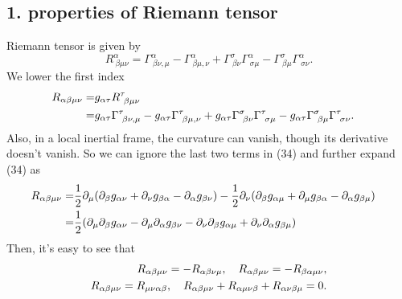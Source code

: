 \documentclass{article}
\begin{document}
\subsection*{1. properties of Riemann tensor}
Riemann tensor is given by
\begin{equation}
R^\alpha_{~\beta \mu\nu} = \Gamma^\alpha_{~\beta \nu, \mu}
-\Gamma^\alpha_{~ \beta\mu,\nu}
+\Gamma^\sigma_{~\beta\nu}\Gamma^\alpha_{~\sigma\mu}
-\Gamma^\sigma_{~\beta \mu}\Gamma^\alpha_{~\sigma \nu}.
\end{equation}
We lower the first index
\begin{align}
R_{\alpha \beta \mu \nu}=& g_{\alpha \tau}R^\tau_{~\beta \mu \nu}\cr
=& g_{\alpha \tau}\Gamma^\tau_{~\beta \nu,\mu}
-g_{\alpha \tau}\Gamma^\tau_{~\beta \mu,\nu}
+g_{\alpha \tau}\Gamma^\sigma_{~\beta\nu}\Gamma^\tau_{~\sigma\mu}
-g_{\alpha \tau}\Gamma^\sigma_{~\beta \mu}\Gamma^\tau_{~\sigma \nu}.
\end{align}
Also, in a local inertial frame, the curvature can vanish, though its derivative doesn't vanish. So we can ignore the last two terms in (34) and further expand (34) as
\begin{align}
R_{\alpha \beta \mu \nu} =& \frac{1}{2}\partial_\mu(\partial_\beta g_{\alpha \nu}+ \partial_\nu g_{\beta\alpha}-\partial_\alpha g_{\beta \nu})
-\frac{1}{2}\partial_\nu(\partial_\beta g_{\alpha \mu}+ \partial_\mu g_{\beta\alpha}-\partial_\alpha g_{\beta \mu})\cr
=&\frac{1}{2}(\partial_\mu\partial_\beta g_{\alpha \nu}
-\partial_\mu \partial_\alpha g_{\beta \nu}-\partial_\nu\partial_\beta g_{\alpha \mu}+\partial_\nu\partial_\alpha g_{\beta \mu})\cr
\end{align}
Then, it's easy to see that 
\begin{align}
R_{\alpha \beta \mu \nu} = -R_{\alpha \beta \nu \mu},
\quad R_{\alpha\beta\mu\nu} = -R_{\beta\alpha\mu\nu}, \cr
R_{\alpha \beta \mu \nu}= R_{\mu \nu \alpha \beta},
\quad R_{\alpha \beta \mu \nu}+ R_{\alpha \mu \nu \beta}+R_{\alpha \nu \beta \mu}=0.
\end{align}
\end{document}

